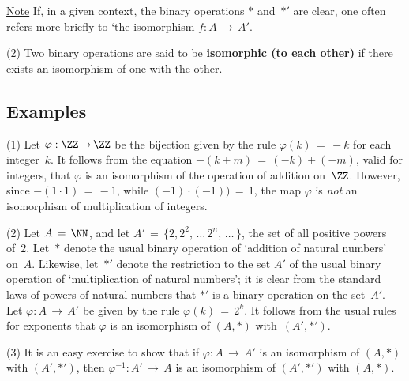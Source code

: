         \underline{Note} If, in a given context, the binary operations ${\ast}$ and~${\ast}'$ are clear,
    one often refers more briefly to `the isomorphism $f:A \,{\rightarrow}\, A'$.

\V

        (2) Two binary operations are said to be {\bf isomorphic (to each other)} if there exists an isomorphism of one with the other.

\VV

            \subsection{\small{\bf Examples}}
            \label{ExampA60.80}

\V

\hspace*{\parindent} (1) Let ${\varphi}:{\ZZ} \,{\rightarrow}\, {\ZZ}$ be the bijection given by the rule ${\varphi}(k) \,=\, -k$ for each integer~$k$.
    It follows from the equation $-(k+m) \,=\, (-k) + (-m)$, valid  for integers,
    that ${\varphi}$ is an isomorphism of the operation of addition on~${\ZZ}$.
    However, since $-(1{\cdot}1) \,=\, -1$, while $(-1){\cdot}(-1)) \,=\, 1$, the map ${\varphi}$ is {\em not} an isomorphism of multiplication of integers.

\V

        (2) Let $A \,=\, {\NN}$, and let $A' \,=\, \{2, 2^{2}, \,{\ldots}\, 2^{n},\,{\ldots}\,\}$, the set of all positive powers of~$2$.
    Let~${\ast}$ denote the usual binary operation of `addition of natural numbers' on~$A$.
    Likewise, let~${\ast}'$ denote the restriction to the set $A'$ of the usual binary operation of `multiplication of natural numbers';
    it is clear from the standard laws of powers of natural numbers that ${\ast}'$ is a binary operation on the set~$A'$.
    Let ${\varphi}:A \,{\rightarrow}\, A'$ be given by the rule ${\varphi}(k) \,=\, 2^{k}$.
    It follows from the usual rules for exponents that ${\varphi}$ is an isomorphism of $(A,{\ast})$ with~$(A',{\ast}')$.

\V

        (3) It is an easy exercise to show that if ${\varphi}:A \,{\rightarrow}\, A'$ is an isomorphism of $(A,{\ast})$ with $(A',{\ast}')$, 
    then ${\varphi}^{-1}:A' \,{\rightarrow}\, A$ is an isomorphism of $(A',{\ast}')$ with $(A,{\ast})$.


\V

